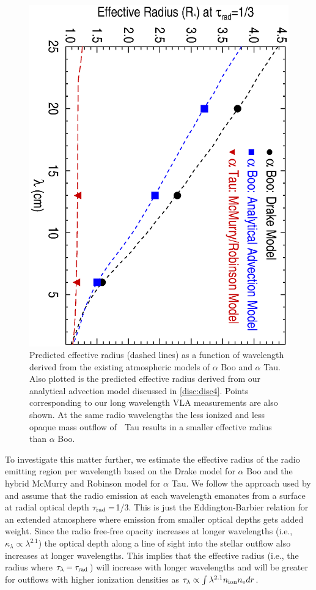 \documentclass[iop]{emulateapj}
\begin{document}
\begin{figure}
\includegraphics[trim = 5mm 0mm 10mm 20mm, clip,scale=0.4,angle=90]{fig5.ps}
\caption{Predicted effective radius (dashed lines) as a function of wavelength derived from the existing atmospheric models of $\alpha$ Boo and $\alpha$ Tau.  Also plotted is the predicted effective radius derived from our analytical advection model discussed in \ref{disc:disc4}. Points corresponding to our long wavelength VLA measurements are also shown. At the same radio wavelengths the less ionized and less opaque mass outflow of  Tau results in a smaller effective radius than $\alpha$ Boo.}
\label{fig:fig5}
\end{figure}

To investigate this matter further,  we estimate the effective radius of the radio emitting region per wavelength based on the Drake model for $\alpha$ Boo and the hybrid McMurry and Robinson model for $\alpha$ Tau. We follow the approach used by \cite{1977ApJ...212..488C} and assume that the radio emission at each wavelength emanates from a surface at radial optical depth $\tau _{\rm{rad}}=$1/3. This is just the Eddington-Barbier relation for an extended atmosphere where emission from smaller optical depths gets added weight. Since the radio free-free opacity increases at longer wavelengths (i.e., $\kappa _{\lambda} \propto \lambda ^{2.1}$) the optical depth along a line of sight into the stellar outflow also increases at longer wavelengths. This implies that the effective radius (i.e., the radius where $\tau _{\lambda} = \tau _{\rm{rad}}$) will increase with longer wavelengths and will be greater for outflows with higher ionization densities as $\tau _{\lambda} \propto \int \lambda ^{2.1}n_{\rm{ion}}n_{\rm{e}} dr$. 
\end{document}
